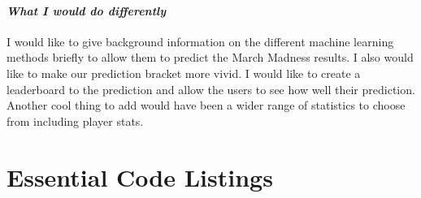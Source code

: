 \documentclass[onecolumn, draftclsnofoot,10pt, compsoc]{IEEEtran}
\begin{document}
\paragraph{\emph{What I would do differently}}
I would like to give background information on the different machine learning methods briefly to allow them to predict the March Madness results. I also would like to make our prediction bracket more vivid. I would like to create a leaderboard to the prediction and allow the users to see how well their prediction. Another cool thing to add would have been a wider range of statistics to choose from including player stats.








\appendices
\section{Essential Code Listings}
\label{EssentialCodeListings}
\end{document}
